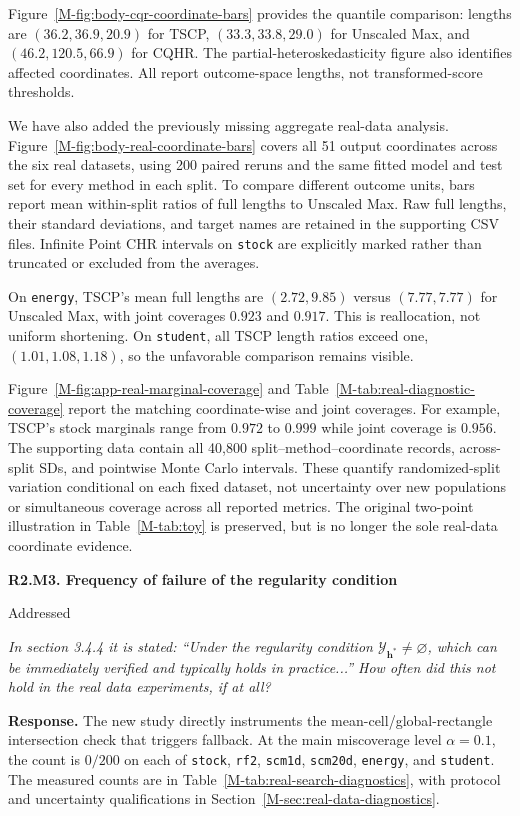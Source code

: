 \documentclass[11pt]{article}
\newcommand{\mssec}[1]{Section~\ref*{M-#1}}
\newcommand{\msfig}[1]{Figure~\ref*{M-#1}}
\newcommand{\mstab}[1]{Table~\ref*{M-#1}}
\newcommand{\point}[3]{\par\Needspace{7\baselineskip}\medskip
\noindent\parbox[t]{0.77\linewidth}{\textbf{#1}}\hfill
\parbox[t]{0.21\linewidth}{\raggedleft\small\sffamily #2}\par\nopagebreak
{\color{ReviewerBlue}\small\itshape #3\par}\textbf{Response.} }
\begin{document}
\msfig{fig:body-cqr-coordinate-bars} provides the quantile comparison: lengths are $(36.2,36.9,20.9)$ for TSCP, $(33.3,33.8,29.0)$ for Unscaled Max, and $(46.2,120.5,66.9)$ for CQHR. The partial-heteroskedasticity figure also identifies affected coordinates. All report outcome-space lengths, not transformed-score thresholds.

We have also added the previously missing aggregate real-data analysis. \msfig{fig:body-real-coordinate-bars} covers all 51 output coordinates across the six real datasets, using 200 paired reruns and the same fitted model and test set for every method in each split. To compare different outcome units, bars report mean within-split ratios of full lengths to Unscaled Max. Raw full lengths, their standard deviations, and target names are retained in the supporting CSV files. Infinite Point CHR intervals on \texttt{stock} are explicitly marked rather than truncated or excluded from the averages.

On \texttt{energy}, TSCP's mean full lengths are $(2.72,9.85)$ versus $(7.77,7.77)$ for Unscaled Max, with joint coverages $0.923$ and $0.917$. This is reallocation, not uniform shortening. On \texttt{student}, all TSCP length ratios exceed one, $(1.01,1.08,1.18)$, so the unfavorable comparison remains visible.

\msfig{fig:app-real-marginal-coverage} and \mstab{tab:real-diagnostic-coverage} report the matching coordinate-wise and joint coverages. For example, TSCP's stock marginals range from $0.972$ to $0.999$ while joint coverage is $0.956$. The supporting data contain all 40,800 split--method--coordinate records, across-split SDs, and pointwise Monte Carlo intervals. These quantify randomized-split variation conditional on each fixed dataset, not uncertainty over new populations or simultaneous coverage across all reported metrics. The original two-point illustration in \mstab{tab:toy} is preserved, but is no longer the sole real-data coordinate evidence.

\point{R2.M3. Frequency of failure of the regularity condition}{Addressed}{In section 3.4.4 it is stated: ``Under the regularity condition
$\mathcal Y_{\bm h^*}\ne\varnothing$, which can be immediately
verified and typically holds in practice...'' How often did this
not hold in the real data experiments, if at all?}
\label{response:R2.M3}
The new study directly instruments the mean-cell/global-rectangle intersection check that triggers fallback. At the main miscoverage level $\alpha=0.1$, the count is $0/200$ on each of \texttt{stock}, \texttt{rf2}, \texttt{scm1d}, \texttt{scm20d}, \texttt{energy}, and \texttt{student}. The measured counts are in \mstab{tab:real-search-diagnostics}, with protocol and uncertainty qualifications in \mssec{sec:real-data-diagnostics}.
\end{document}
